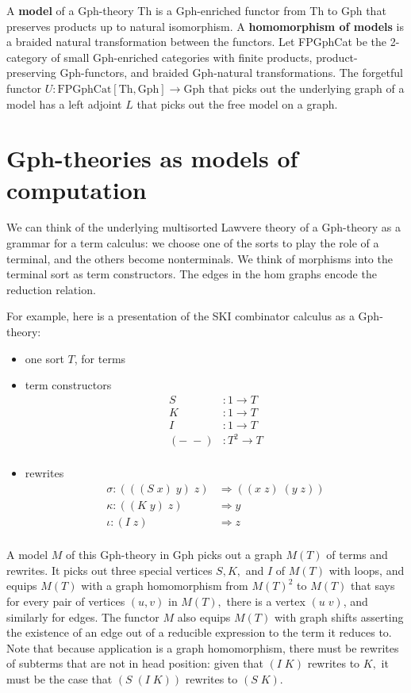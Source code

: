 \documentclass{llncs}
\newcommand{\maps}{\colon}
\newcommand{\Th}{\mathrm{Th}}
\newcommand{\Gph}{\mathrm{Gph}}
\newcommand{\FPGphCat}{\mathrm{FPGphCat}}
\begin{document}
A {\bf model} of a Gph-theory Th is a Gph-enriched functor from Th to Gph that preserves products up to natural isomorphism.  A {\bf homomorphism of models} is a braided natural transformation between the functors.  Let FPGphCat be the 2-category of small Gph-enriched categories with finite products, product-preserving Gph-functors, and braided Gph-natural transformations.  The forgetful functor $U\maps \FPGphCat[\Th, \Gph] \to \Gph$ that picks out the underlying graph of a model has a left adjoint $L$ that picks out the free model on a graph.

\section{Gph-theories as models of computation}

We can think of the underlying multisorted Lawvere theory of a Gph-theory as a grammar for a term calculus: we choose one of the sorts to play the role of a terminal, and the others become nonterminals.  We think of morphisms into the terminal sort as term constructors.  The edges in the hom graphs encode the reduction relation.

For example, here is a presentation of the SKI combinator calculus as a Gph-theory:
\begin{itemize}
  \item one sort $T$, for terms
  \item term constructors
  \[\begin{array}{rl}
    S&:1 \to T\\
    K&:1 \to T\\
    I&:1 \to T\\
    (-\; -)&: T^2 \to T\\
  \end{array}\]
  \item rewrites
  \[\begin{array}{rl}
    \sigma:(((S\; x)\; y)\; z) &\Rightarrow ((x\; z)\; (y\; z))\\
    \kappa:((K\; y)\; z) &\Rightarrow y\\
    \iota:(I\; z) &\Rightarrow z\\
  \end{array}\]
\end{itemize}
A model $M$ of this Gph-theory in Gph picks out a graph $M(T)$ of terms and rewrites.  It picks out three special vertices $S,K,$ and $I$ of $M(T)$ with loops, and equips $M(T)$ with a graph homomorphism from $M(T)^2$ to $M(T)$ that says for every pair of vertices $(u,v)$ in $M(T),$ there is a vertex $(u\;v)$, and similarly for edges.  The functor $M$ also equips $M(T)$ with graph shifts asserting the existence of an edge out of a reducible expression to the term it reduces to.  Note that because application is a graph homomorphism, there must be rewrites of subterms that are not in head position: given that $(I\; K)$ rewrites to $K,$ it must be the case that $(S\; (I\; K))$ rewrites to $(S\; K).$
\end{document}
